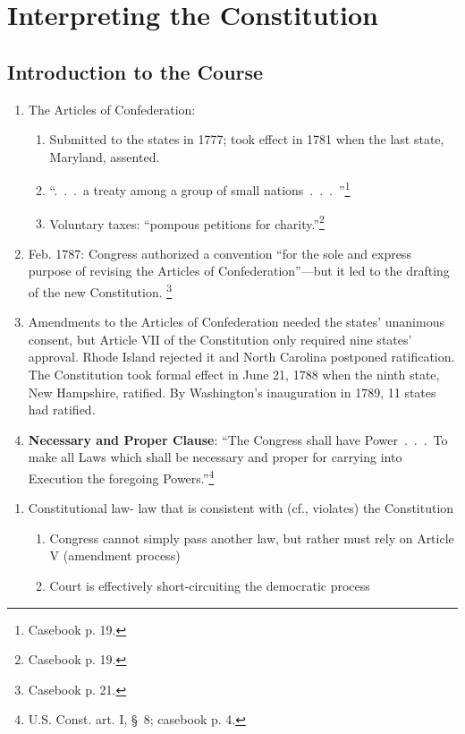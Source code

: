 \section{Interpreting the Constitution}

\subsection{Introduction to the Course}

\begin{enumerate}
    \item The Articles of Confederation:
    \begin{enumerate}
        \item Submitted to the states in 1777; took effect in 1781 when the 
        last state, Maryland, assented.
        \item ``.~.~.~a treaty among a group of small 
        nations~.~.~.~''\footnote{Casebook p.  19.}
        \item Voluntary taxes: ``pompous petitions for 
        charity.''\footnote{Casebook p. 19.}
\end{enumerate}
    \item Feb. 1787: Congress authorized a convention ``for the sole and 
    express purpose of revising the Articles of 
    Confederation''---but it led to the drafting of the new Constitution. 
    \footnote{Casebook p. 21.}
    \item Amendments to the Articles of Confederation needed the states' 
    unanimous consent, but Article VII of the Constitution only required nine 
    states' approval. Rhode Island rejected it and North Carolina postponed 
    ratification. The Constitution took formal effect in June 21, 1788 when 
    the ninth state, New Hampshire, ratified. By Washington's inauguration in 
    1789, 11 states had ratified.
    \item \textbf{Necessary and Proper Clause}: ``The Congress shall have 
    Power~.~.~.~To make all Laws which shall be necessary and proper for carrying 
    into Execution the foregoing Powers.''\footnote{U.S. Const. art. I, \S\ 8; 
    casebook p. 4.}
   \end{enumerate}
    \begin{enumerate}
    \item Constitutional law- law that is consistent with (cf., violates) the Constitution
    \begin{enumerate}
    \item Congress cannot simply pass another law, but rather must rely on Article V (amendment process)
    \item Court is effectively short-circuiting the democratic process
\end {enumerate}
\end {enumerate}
